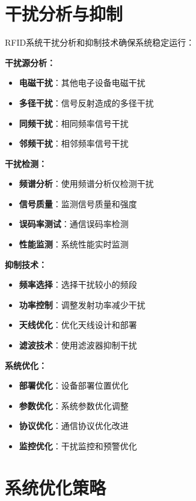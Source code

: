 \documentclass[12pt,UTF8]{ctexbook}
\begin{document}
\begin{itemize}[leftmargin=3.5em]
\begin{itemize}[leftmargin=3.5em]
\begin{itemize}[leftmargin=3.5em]
\begin{itemize}[leftmargin=3.5em]
\section{干扰分析与抑制}

RFID系统干扰分析和抑制技术确保系统稳定运行：

\textbf{干扰源分析：}
\begin{itemize}[leftmargin=3.5em]
    \item \textbf{电磁干扰}：其他电子设备电磁干扰
    \item \textbf{多径干扰}：信号反射造成的多径干扰
    \item \textbf{同频干扰}：相同频率信号干扰
    \item \textbf{邻频干扰}：相邻频率信号干扰
\end{itemize}

\textbf{干扰检测：}
\begin{itemize}[leftmargin=3.5em]
    \item \textbf{频谱分析}：使用频谱分析仪检测干扰
    \item \textbf{信号质量}：监测信号质量和强度
    \item \textbf{误码率测试}：通信误码率检测
    \item \textbf{性能监测}：系统性能实时监测
\end{itemize}

\textbf{抑制技术：}
\begin{itemize}[leftmargin=3.5em]
    \item \textbf{频率选择}：选择干扰较小的频段
    \item \textbf{功率控制}：调整发射功率减少干扰
    \item \textbf{天线优化}：优化天线设计和部署
    \item \textbf{滤波技术}：使用滤波器抑制干扰
\end{itemize}

\textbf{系统优化：}
\begin{itemize}[leftmargin=3.5em]
    \item \textbf{部署优化}：设备部署位置优化
    \item \textbf{参数优化}：系统参数优化调整
    \item \textbf{协议优化}：通信协议优化改进
    \item \textbf{监控优化}：干扰监控和预警优化
\end{itemize}

\section{系统优化策略}


\end{itemize}
\end{itemize}
\end{itemize}
\end{itemize}
\end{document}
